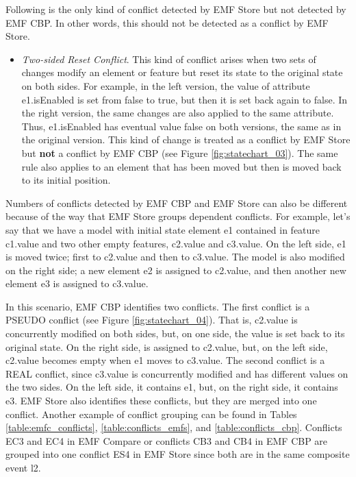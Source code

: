 Following is the only kind of conflict detected by EMF Store but not detected by EMF CBP. In other words, this should not be detected as a conflict by EMF Store.
\begin{itemize}
  \item \emph{Two-sided Reset Conflict}. This kind of conflict arises when two sets of changes modify an element or feature but reset its state to the original state on both sides. For example, in the left version, the value of attribute \textsf{e1}.\textsf{isEnabled} is set from \textsf{false} to \textsf{true}, but then it is set back again to \textsf{false}. In the right version, the same changes are also applied to the same attribute. Thus, \textsf{e1}.\textsf{isEnabled} has eventual value \textsf{false} on both versions, the same as in the original version. This kind of change is treated as a conflict by EMF Store but \textbf{not} a conflict by EMF CBP (see Figure \ref{fig:statechart_03}). The same rule also applies to an element that has been moved but then is moved back to its initial position.
\end{itemize}

Numbers of conflicts detected by EMF CBP and EMF Store can also be different because of the way that EMF Store groups dependent conflicts. For example, let’s say that we have a model with initial state element \textsf{e1} contained in feature \textsf{c1}.\textsf{value} and two other empty features, \textsf{c2}.\textsf{value} and \textsf{c3}.\textsf{value}. On the left side, \textsf{e1} is moved twice; first to \textsf{c2}.\textsf{value} and then to \textsf{c3}.\textsf{value}. The model is also modified on the right side; a new element \textsf{e2} is assigned to \textsf{c2}.\textsf{value}, and then another new element \textsf{e3} is assigned to \textsf{c3}.\textsf{value}.

In this scenario, EMF CBP identifies two conflicts. The first conflict is a \textsf{PSEUDO} conflict (see Figure \ref{fig:statechart_04}). That is, \textsf{c2}.\textsf{value} is concurrently modified on both sides, but, on one side, the value is set back to its original state. On the right side,  is assigned to \textsf{c2}.\textsf{value}, but, on the left side, \textsf{c2}.\textsf{value} becomes empty when \textsf{e1} moves to \textsf{c3}.\textsf{value}. The second conflict is a \textsf{REAL} conflict, since \textsf{c3}.\textsf{value} is concurrently modified and has different values on the two sides. On the left side, it contains \textsf{e1}, but, on the right side, it contains \textsf{e3}. EMF Store also identifies these conflicts, but they are merged into one conflict. Another example of conflict grouping can be found in Tables \ref{table:emfc_conflicts}, \ref{table:conflicts_emfs}, and \ref{table:conflicts_cbp}. Conflicts \textsf{EC3} and \textsf{EC4} in EMF Compare or conflicts \textsf{CB3} and \textsf{CB4} in EMF CBP are grouped into one conflict \textsf{ES4} in EMF Store since both are in the same composite event \textsf{l2}.


